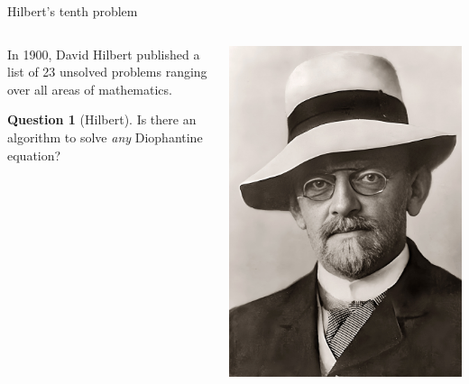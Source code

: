 \documentclass[10pt]{beamer}
\theoremstyle{definition}
\newtheorem{question}{Question}
\begin{document}
\begin{frame}[t]{Hilbert's tenth problem}

\begin{columns}[T]

\begin{column}{0.8\textwidth}
In 1900, David Hilbert published a list of 23 unsolved problems ranging over all areas of mathematics.

\vspace{0.5cm}

\begin{question}[Hilbert]
Is there an algorithm to solve \emph{any} Diophantine equation?
\end{question}
\end{column}

\begin{column}{0.1\textwidth}
\hspace{-1cm}
\includegraphics[width=1.5\textwidth]{hilbert.jpg}
\end{column}


\end{columns}
\end{frame}
\end{document}
